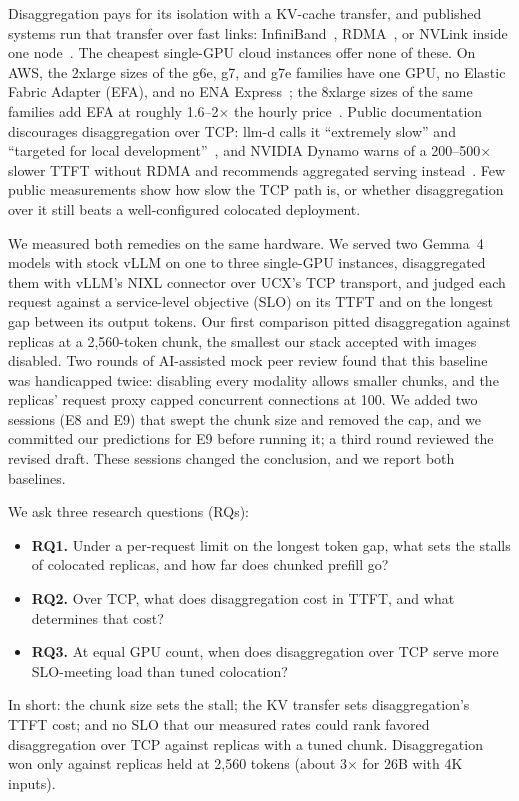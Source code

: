 \documentclass[11pt]{article}
\begin{document}
Disaggregation pays for its isolation with a KV-cache transfer, and published systems run that transfer over fast links: InfiniBand~\cite{splitwise}, RDMA~\cite{mooncake}, or NVLink inside one node~\cite{distserve}. The cheapest single-GPU cloud instances offer none of these. On AWS, the 2xlarge sizes of the g6e, g7, and g7e families have one GPU, no Elastic Fabric Adapter (EFA), and no ENA Express~\cite{awsspecs}; the 8xlarge sizes of the same families add EFA at roughly 1.6--2$\times$ the hourly price~\cite{awsefa,vantage}. Public documentation discourages disaggregation over TCP: llm-d calls it ``extremely slow'' and ``targeted for local development''~\cite{llmddocs}, and NVIDIA Dynamo warns of a 200--500$\times$ slower TTFT without RDMA and recommends aggregated serving instead~\cite{dynamodocs}. Few public measurements show how slow the TCP path is, or whether disaggregation over it still beats a well-configured colocated deployment.

We measured both remedies on the same hardware. We served two Gemma~4 models with stock vLLM on one to three single-GPU instances, disaggregated them with vLLM's NIXL connector over UCX's TCP transport, and judged each request against a service-level objective (SLO) on its TTFT and on the longest gap between its output tokens. Our first comparison pitted disaggregation against replicas at a 2,560-token chunk, the smallest our stack accepted with images disabled. Two rounds of AI-assisted mock peer review found that this baseline was handicapped twice: disabling every modality allows smaller chunks, and the replicas' request proxy capped concurrent connections at 100. We added two sessions (E8 and E9) that swept the chunk size and removed the cap, and we committed our predictions for E9 before running it; a third round reviewed the revised draft. These sessions changed the conclusion, and we report both baselines.

We ask three research questions (RQs):
\begin{itemize}
  \item \textbf{RQ1.} Under a per-request limit on the longest token gap, what sets the stalls of colocated replicas, and how far does chunked prefill go?
  \item \textbf{RQ2.} Over TCP, what does disaggregation cost in TTFT, and what determines that cost?
  \item \textbf{RQ3.} At equal GPU count, when does disaggregation over TCP serve more SLO-meeting load than tuned colocation?
\end{itemize}
In short: the chunk size sets the stall; the KV transfer sets disaggregation's TTFT cost; and no SLO that our measured rates could rank favored disaggregation over TCP against replicas with a tuned chunk. Disaggregation won only against replicas held at 2,560 tokens (about 3$\times$ for 26B with 4K inputs).
\end{document}
